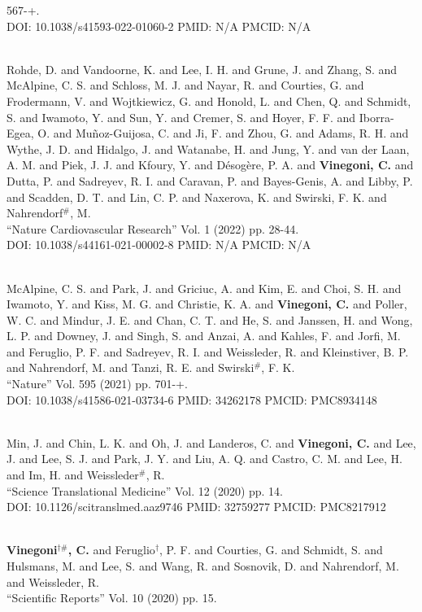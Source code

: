 567-+. \\ DOI: 10.1038/s41593-022-01060-2 PMID: N/A PMCID: N/A\item {} \\ Rohde, D. and Vandoorne, K. and Lee, I. H. and Grune, J. and Zhang, S. and McAlpine, C. S. and Schloss, M. J. and Nayar, R. and Courties, G. and Frodermann, V. and Wojtkiewicz, G. and Honold, L. and Chen, Q. and Schmidt, S. and Iwamoto, Y. and Sun, Y. and Cremer, S. and Hoyer, F. F. and Iborra-Egea, O. and Muñoz-Guijosa, C. and Ji, F. and Zhou, G. and Adams, R. H. and Wythe, J. D. and Hidalgo, J. and Watanabe, H. and Jung, Y. and van der Laan, A. M. and Piek, J. J. and Kfoury, Y. and Désogère, P. A. and {\bf Vinegoni, C.} and Dutta, P. and Sadreyev, R. I. and Caravan, P. and Bayes-Genis, A. and Libby, P. and Scadden, D. T. and Lin, C. P. and Naxerova, K. and Swirski, F. K. and Nahrendorf$^\#$, M. \\ ``Nature Cardiovascular Research'' Vol. 1 (2022) pp. 28-44. \\ DOI: 10.1038/s44161-021-00002-8 PMID: N/A PMCID: N/A\item {} \\ McAlpine, C. S. and Park, J. and Griciuc, A. and Kim, E. and Choi, S. H. and Iwamoto, Y. and Kiss, M. G. and Christie, K. A. and {\bf Vinegoni, C.} and Poller, W. C. and Mindur, J. E. and Chan, C. T. and He, S. and Janssen, H. and Wong, L. P. and Downey, J. and Singh, S. and Anzai, A. and Kahles, F. and Jorfi, M. and Feruglio, P. F. and Sadreyev, R. I. and Weissleder, R. and Kleinstiver, B. P. and Nahrendorf, M. and Tanzi, R. E. and Swirski$^\#$, F. K. \\ ``Nature'' Vol. 595 (2021) pp. 701-+. \\ DOI: 10.1038/s41586-021-03734-6 PMID: 34262178 PMCID: PMC8934148\item {} \\ Min, J. and Chin, L. K. and Oh, J. and Landeros, C. and {\bf Vinegoni, C.} and Lee, J. and Lee, S. J. and Park, J. Y. and Liu, A. Q. and Castro, C. M. and Lee, H. and Im, H. and Weissleder$^\#$, R. \\ ``Science Translational Medicine'' Vol. 12 (2020) pp. 14. \\ DOI: 10.1126/scitranslmed.aaz9746 PMID: 32759277 PMCID: PMC8217912\item {} \\ {\bf Vinegoni$^{\dag \#}$, C.} and Feruglio$^\dag$, P. F. and Courties, G. and Schmidt, S. and Hulsmans, M. and Lee, S. and Wang, R. and Sosnovik, D. and Nahrendorf, M. and Weissleder, R. \\ ``Scientific Reports'' Vol. 10 (2020) pp. 15. \\ 